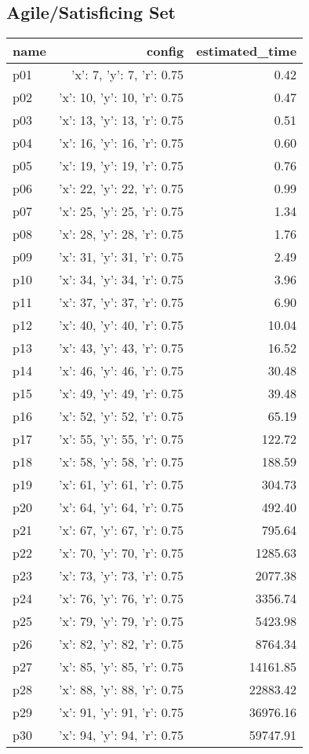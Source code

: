 \documentclass{article}
\begin{document}
                                \subsection*{Agile/Satisficing Set}
                                
                            \begin{center}
                            \scriptsize
                            \begin{tabular}{@{}l|r|r@{}}
                            name & config & estimated\_time\\\midrule
                              p01&{'x': 7, 'y': 7, 'r': 0.75}&0.42\\
  p02&{'x': 10, 'y': 10, 'r': 0.75}&0.47\\
  p03&{'x': 13, 'y': 13, 'r': 0.75}&0.51\\
  p04&{'x': 16, 'y': 16, 'r': 0.75}&0.60\\
  p05&{'x': 19, 'y': 19, 'r': 0.75}&0.76\\
  p06&{'x': 22, 'y': 22, 'r': 0.75}&0.99\\
  p07&{'x': 25, 'y': 25, 'r': 0.75}&1.34\\
  p08&{'x': 28, 'y': 28, 'r': 0.75}&1.76\\
  p09&{'x': 31, 'y': 31, 'r': 0.75}&2.49\\
  p10&{'x': 34, 'y': 34, 'r': 0.75}&3.96\\
  p11&{'x': 37, 'y': 37, 'r': 0.75}&6.90\\
  p12&{'x': 40, 'y': 40, 'r': 0.75}&10.04\\
  p13&{'x': 43, 'y': 43, 'r': 0.75}&16.52\\
  p14&{'x': 46, 'y': 46, 'r': 0.75}&30.48\\
  p15&{'x': 49, 'y': 49, 'r': 0.75}&39.48\\
  p16&{'x': 52, 'y': 52, 'r': 0.75}&65.19\\
  p17&{'x': 55, 'y': 55, 'r': 0.75}&122.72\\
  p18&{'x': 58, 'y': 58, 'r': 0.75}&188.59\\
  p19&{'x': 61, 'y': 61, 'r': 0.75}&304.73\\
  p20&{'x': 64, 'y': 64, 'r': 0.75}&492.40\\
  p21&{'x': 67, 'y': 67, 'r': 0.75}&795.64\\
  p22&{'x': 70, 'y': 70, 'r': 0.75}&1285.63\\
  p23&{'x': 73, 'y': 73, 'r': 0.75}&2077.38\\
  p24&{'x': 76, 'y': 76, 'r': 0.75}&3356.74\\
  p25&{'x': 79, 'y': 79, 'r': 0.75}&5423.98\\
  p26&{'x': 82, 'y': 82, 'r': 0.75}&8764.34\\
  p27&{'x': 85, 'y': 85, 'r': 0.75}&14161.85\\
  p28&{'x': 88, 'y': 88, 'r': 0.75}&22883.42\\
  p29&{'x': 91, 'y': 91, 'r': 0.75}&36976.16\\
  p30&{'x': 94, 'y': 94, 'r': 0.75}&59747.91
                            \end{tabular}
                            \end{center}
                    
\end{document}
